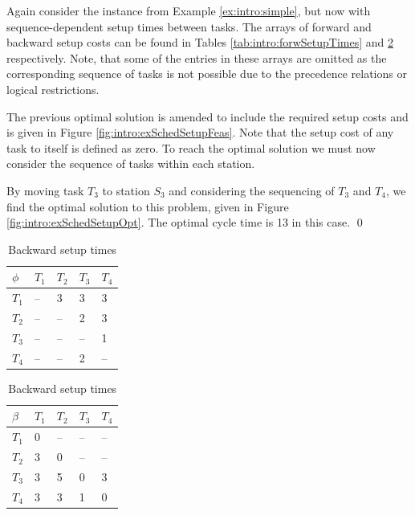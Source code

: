 
\begin{example}\label{ex:intro:simpleSetup}
	Again consider the instance from Example \ref{ex:intro:simple},
	but now with sequence-dependent setup times
	between tasks.
	The arrays of forward and backward setup costs
	can be found in Tables \ref{tab:intro:forwSetupTimes}
	and \ref{tab:intro:backSetupTimes} respectively.
	Note, that some of the entries in these arrays are
	omitted as the corresponding sequence of tasks is not 
	possible due to the precedence relations or
	logical restrictions.

	The previous optimal solution is amended
	to include the required setup costs and is given in Figure 
	\ref{fig:intro:exSchedSetupFeas}.
	Note that the setup cost of any task to itself is 
	defined as zero.
	To reach the optimal solution we must now consider
	the sequence of tasks within each station.

	By moving task $T_3$ to station $S_3$ and considering
	the sequencing of $T_3$ and $T_4$, we find the optimal
	solution to this problem, given in Figure \ref{fig:intro:exSchedSetupOpt}.
	The optimal cycle time is 13 in this case.	\qed
\end{example}

\begin{table}[tpb]
	\centering
	\begin{minipage}{0.45\textwidth}
		\def\arraystretch{1.1}
		\centering
		\caption{Forward setup times}
		\vspace{2mm}
		\begin{tabular}{lllll}
			\toprule
			$\phi$ & $T_1$ & $T_2$ & $T_3$ & $T_4$ \\\midrule\midrule
			$T_1$ & -- & 3 & 3 & 3 \\
			$T_2$ & -- & -- & 2 & 3 \\
			$T_3$ & -- & -- & -- & 1 \\
			$T_4$ & -- & -- & 2 & -- \\
			\bottomrule
		\end{tabular}
		\label{tab:intro:forwSetupTimes}
	\end{minipage}
	\hfill
	\begin{minipage}{0.45\textwidth}
		\def\arraystretch{1.1}
		\centering
		\caption{Backward setup times}
		\vspace{2mm}
		\begin{tabular}{lllll}
			\toprule
			$\beta$ & $T_1$ & $T_2$ & $T_3$ & $T_4$ \\\midrule\midrule
			$T_1$ & 0 & -- & -- & -- \\
			$T_2$ & 3 & 0 & -- & -- \\
			$T_3$ & 3 & 5 & 0 & 3 \\
			$T_4$ & 3 & 3 & 1 & 0 \\
			\bottomrule
		\end{tabular}
		\label{tab:intro:backSetupTimes}
	\end{minipage}
\end{table}

